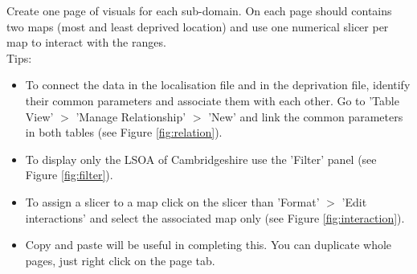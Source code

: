\documentclass[11pt]{article}
\begin{document}
Create one page of visuals for each sub-domain. On each page should contains two maps (most and least deprived location) and use one numerical slicer per map to interact with the ranges.\\

Tips:
\begin{itemize}
    \item To connect the data in the localisation file and in the deprivation file, identify their common parameters and associate them with each other. Go to 'Table View' $>$ 'Manage Relationship' $>$ 'New' and link the common parameters in both tables (see Figure \ref{fig:relation}).
    \item To display only the LSOA of Cambridgeshire use the 'Filter' panel (see Figure \ref{fig:filter}).
    \item To assign a slicer to a map click on the slicer than 'Format' $>$ 'Edit interactions' and select the associated map only (see Figure \ref{fig:interaction}).
    \item Copy and paste will be useful in completing this. You can duplicate whole pages, just right click on the page tab.
\end{itemize}
\end{document}
